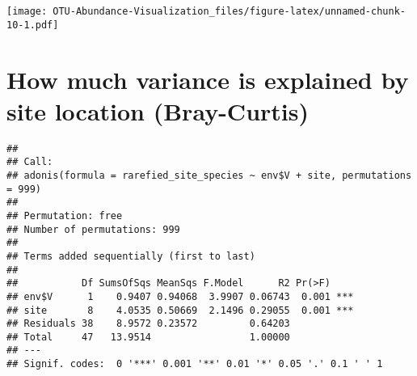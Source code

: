 \documentclass[
]{article}
\newenvironment{Shaded}{\begin{snugshade}}{\end{snugshade}}
\newcommand{\AttributeTok}[1]{\textcolor[rgb]{0.77,0.63,0.00}{#1}}
\newcommand{\DecValTok}[1]{\textcolor[rgb]{0.00,0.00,0.81}{#1}}
\newcommand{\FunctionTok}[1]{\textcolor[rgb]{0.00,0.00,0.00}{#1}}
\newcommand{\NormalTok}[1]{#1}
\newcommand{\OtherTok}[1]{\textcolor[rgb]{0.56,0.35,0.01}{#1}}
\newcommand{\SpecialCharTok}[1]{\textcolor[rgb]{0.00,0.00,0.00}{#1}}
\newcommand{\StringTok}[1]{\textcolor[rgb]{0.31,0.60,0.02}{#1}}
\begin{document}
\texttt{[image: OTU-Abundance-Visualization\_files/figure-latex/unnamed-chunk-10-1.pdf]}

\hypertarget{how-much-variance-is-explained-by-site-location-bray-curtis}{%
\section{How much variance is explained by site location
(Bray-Curtis)}\label{how-much-variance-is-explained-by-site-location-bray-curtis}}

\begin{Shaded}
\end{Shaded}

\begin{verbatim}
## 
## Call:
## adonis(formula = rarefied_site_species ~ env$V + site, permutations = 999) 
## 
## Permutation: free
## Number of permutations: 999
## 
## Terms added sequentially (first to last)
## 
##           Df SumsOfSqs MeanSqs F.Model      R2 Pr(>F)    
## env$V      1    0.9407 0.94068  3.9907 0.06743  0.001 ***
## site       8    4.0535 0.50669  2.1496 0.29055  0.001 ***
## Residuals 38    8.9572 0.23572         0.64203           
## Total     47   13.9514                 1.00000           
## ---
## Signif. codes:  0 '***' 0.001 '**' 0.01 '*' 0.05 '.' 0.1 ' ' 1
\end{verbatim}
\end{document}
